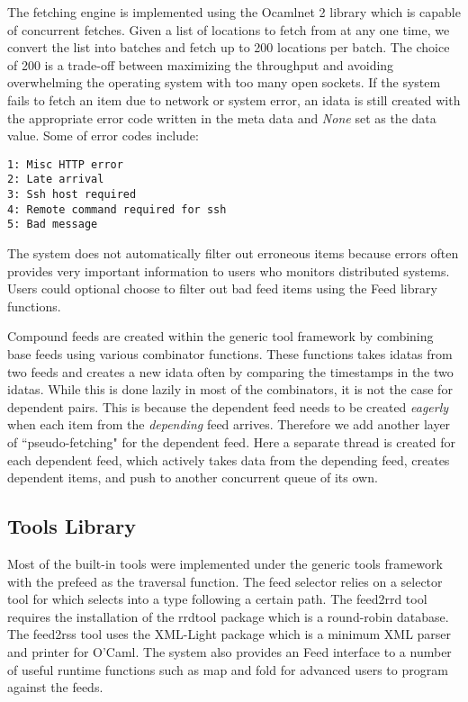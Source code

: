 The fetching engine is implemented using
the Ocamlnet 2 library which is capable of concurrent fetches. 
Given a list of locations to fetch from at any one time, 
we convert the list into batches and fetch up to 200 locations
per batch. The choice of 200 is a trade-off between maximizing
the throughput and avoiding overwhelming the operating system
with too many open sockets. If the system fails to fetch an
item due to network or system error, an idata is still created
with the appropriate error code written in the meta data and
{\em None} set as the data value. Some of error codes include:
{\small \begin{verbatim}
1: Misc HTTP error
2: Late arrival
3: Ssh host required
4: Remote command required for ssh
5: Bad message
\end{verbatim}}
The \padsd{} system does not 
automatically filter out erroneous items because errors often 
provides very important information to users who monitors 
distributed systems. Users could optional choose to filter
out bad feed items using the Feed library functions.

Compound feeds are created within the generic tool framework by
combining base feeds using various combinator functions.
These functions takes idatas from two feeds and creates a new idata often
by comparing the timestamps in the two idatas. While this is done
lazily in most of the combinators, it is not the case for
dependent pairs. This is because the dependent feed needs to be
created {\em eagerly} when each item from the {\em depending}
feed arrives. Therefore we add another layer of ``pseudo-fetching"
for the dependent feed. Here a separate thread is created for each
dependent feed, which actively takes data from the depending
feed, creates dependent items, and push to another concurrent
queue of its own.  
 
\subsection{Tools Library}
Most of the built-in tools were implemented under the
generic tools framework with the prefeed as the traversal
function. The feed selector relies on a selector tool
for \padsml{} which selects into a \padsml{} type following
a certain path. The feed2rrd tool requires the installation
of the rrdtool package which is a round-robin database. 
The feed2rss tool uses the XML-Light package which
is a minimum XML parser and printer for O'Caml.
The system also provides an Feed interface to a number of
useful runtime functions such as map and fold for advanced
users to program against the feeds.

